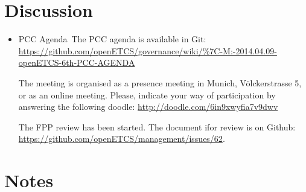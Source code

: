 \documentclass[a4paper, 11pt]{article}
\begin{document}
\section{Discussion}
\begin{itemize}

\item PCC Agenda\
The PCC agenda is available in Git:
 \url{https://github.com/openETCS/governance/wiki/%7C-M:-2014.04.09-openETCS-6th-PCC-AGENDA}
 
The meeting is organised as a presence meeting in Munich, V\"olckerstrasse 5, or as an online meeting. Please, indicate your way of participation by answering the following doodle:
\url{http://doodle.com/6in9xwyfia7v9dwv}

The FPP review has been started. The document ifor review is on Github: \url{https://github.com/openETCS/management/issues/62}.

\end{itemize}

\section{Notes}
\end{document}
